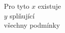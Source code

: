 \documentclass[preview]{standalone}
\begin{document}
\begin{center}
Pro tyto $x$ existuje \\ $y$ splňující \\ všechny podmínky
\end{center}
\end{document}

